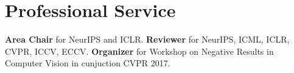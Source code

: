 \section{\mysidestyle \textcolor{olgray}{Professional Service}}
  \textbf{Area Chair}  for NeurIPS and ICLR. \textbf{Reviewer} for NeurIPS, ICML, ICLR, CVPR, ICCV, ECCV. \textbf{Organizer} for  Workshop on Negative Results in Computer Vision in cunjuction CVPR 2017.\\
 
 
\ifx\researchtyperesume\undefined
\else
\vspace{-3mm}
\fi

